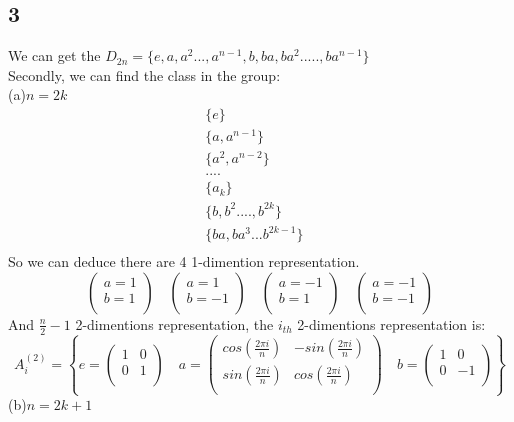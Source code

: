 \documentclass{article}
\begin{document}
\begin{CJK*}{GBK}{song}
\section{3}
We can get the $D_{2n}=\{e,a,a^2...,a^{n-1},b,ba,ba^2.....,ba^{n-1}\}$\\
Secondly, we can find the class in the group:\\
(a)$n=2k$
\begin{equation}
\begin{aligned}
\{e\}&\\
\{a,a^{n-1}\}&\\
\{a^2,a^{n-2}\}&\\
....\\
\{a_k\}&\\
\{b,b^2....,b^{2k}\}&\\
\{ba,ba^{3}...b^{2k-1}\}&\\
\end{aligned}
\end{equation}
So we can deduce there are 4 1-dimention representation.
\begin{equation}
\begin{pmatrix}
     a=1 \\
     b=1 \\
\end{pmatrix}\quad
\begin{pmatrix}
     a=1 \\
     b=-1 \\
\end{pmatrix}\quad
\begin{pmatrix}
     a=-1 \\
     b=1 \\
\end{pmatrix}\quad
\begin{pmatrix}
     a=-1 \\
     b=-1 \\
\end{pmatrix}
\end{equation}
And $\frac{n}{2}-1$ 2-dimentions representation, the $i_{th}$ 2-dimentions representation is:
\begin{equation}
A_i^{(2)}=\left\{
e=
\begin{pmatrix}
     1  &  0 \\
     0  &  1 \\
\end{pmatrix}\quad
a=
\begin{pmatrix}
     cos(\frac{2\pi i}{n}) & -sin(\frac{2\pi i}{n}) \\
     sin(\frac{2\pi i}{n}) &  cos(\frac{2\pi i}{n}) \\
\end{pmatrix}\quad
b=
\begin{pmatrix}
     1  &  0 \\
     0  & -1 \\
\end{pmatrix}
\right\}
\end{equation}
(b)$n=2k+1$


\end{CJK*}
\end{document}
